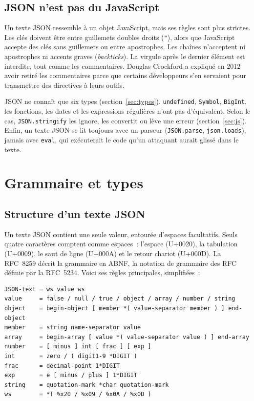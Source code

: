 \documentclass[12pt,a4paper]{article}
\begin{document}
\subsection{JSON n'est pas du JavaScript}
Un texte JSON ressemble à un objet JavaScript, mais ses règles sont plus strictes. Les clés doivent être entre guillemets doubles droits (\texttt{"}), alors que JavaScript accepte des clés sans guillemets ou entre apostrophes. Les chaînes n'acceptent ni apostrophes ni accents graves (\textit{backticks}). La virgule après le dernier élément est interdite, tout comme les commentaires. Douglas Crockford a expliqué en 2012 avoir retiré les commentaires parce que certains développeurs s'en servaient pour transmettre des directives à leurs outils.

JSON ne connaît que six types (section~\ref{sec:types}). \texttt{undefined}, \texttt{Symbol}, \texttt{BigInt}, les fonctions, les dates et les expressions régulières n'ont pas d'équivalent. Selon le cas, \texttt{JSON.stringify} les ignore, les convertit ou lève une erreur (section~\ref{sec:js}). Enfin, un texte JSON se lit toujours avec un parseur (\texttt{JSON.parse}, \texttt{json.loads}), jamais avec \texttt{eval}, qui exécuterait le code qu'un attaquant aurait glissé dans le texte.

\section{Grammaire et types}
\label{sec:grammaire}

\subsection{Structure d'un texte JSON}
Un texte JSON contient une seule valeur, entourée d'espaces facultatifs. Seuls quatre caractères comptent comme espaces~: l'espace (U+0020), la tabulation (U+0009), le saut de ligne (U+000A) et le retour chariot (U+000D). La RFC~8259 décrit la grammaire en ABNF, la notation de grammaire des RFC définie par la RFC~5234. Voici ses règles principales, simplifiées~:

\begin{lstlisting}[caption={Extrait simplifié de la grammaire ABNF de la RFC 8259}]
JSON-text = ws value ws
value     = false / null / true / object / array / number / string
object    = begin-object [ member *( value-separator member ) ] end-object
member    = string name-separator value
array     = begin-array [ value *( value-separator value ) ] end-array
number    = [ minus ] int [ frac ] [ exp ]
int       = zero / ( digit1-9 *DIGIT )
frac      = decimal-point 1*DIGIT
exp       = e [ minus / plus ] 1*DIGIT
string    = quotation-mark *char quotation-mark
ws        = *( %x20 / %x09 / %x0A / %x0D )
\end{lstlisting}
\end{document}
